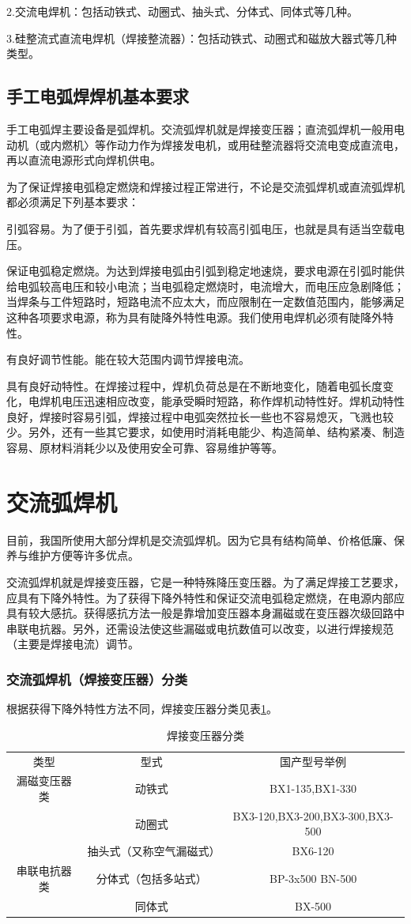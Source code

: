 \documentclass{ctexbook}
\begin{document}
2.交流电焊机：包括动铁式、动圈式、抽头式、分体式、同体式等几种。

3.硅整流式直流电焊机（焊接整流器）：包括动铁式、动圈式和磁放大器式等几种类型。
\subsection{手工电弧焊焊机基本要求}
手工电弧焊主要设备是弧焊机。交流弧焊机就是焊接变压器；直流弧焊机一般用电动机（或内燃机〉等作动力作为焊接发电机，或用硅整流器将交流电变成直流电，再以直流电源形式向焊机供电。

为了保证焊接电弧稳定燃烧和焊接过程正常进行，不论是交流弧焊机或直流弧焊机都必须满足下列基本要求：

引弧容易。为了便于引弧，首先要求焊机有较高引弧电压，也就是具有适当空载电压。

保证电弧稳定燃烧。为达到焊接电弧由引弧到稳定地速烧，要求电源在引弧时能供给电弧较高电压和较小电流；当电弧稳定燃烧时，电流增大，而电压应急剧降低；当焊条与工件短路时，短路电流不应太大，而应限制在一定数值范围内，能够满足这种各项要求电源，称为具有陡降外特性电源。我们使用电焊机必须有陡降外特性。

有良好调节性能。能在较大范围内调节焊接电流。

具有良好动特性。在焊接过程中，焊机负荷总是在不断地变化，随着电弧长度变化，电焊机电压迅速相应改变，能承受瞬时短路，称作焊机动特性好。焊机动特性良好，焊接时容易引弧，焊接过程中电弧突然拉长一些也不容易熄灭，飞溅也较少。另外，还有一些其它要求，如使用时消耗电能少、构造简单、结构紧凑、制造容易、原材料消耗少以及使用安全可靠、容易维护等等。
\section{交流弧焊机}
目前，我国所使用大部分焊机是交流弧焊机。因为它具有结构简单、价格低廉、保养与维护方便等许多优点。

交流弧焊机就是焊接变压器，它是一种特殊降压变压器。为了满足焊接工艺要求，应具有下降外特性。为了获得下降外特性和保证交流电弧稳定燃烧，在电源内部应具有较大感抗。获得感抗方法一般是靠增加变压器本身漏磁或在变压器次级回路中串联电抗器。另外，还需设法使这些漏磁或电抗数值可以改变，以进行焊接规范（主要是焊接电流）调节。
\subsubsection{交流弧焊机（焊接变压器）分类}
根据获得下降外特性方法不同，焊接变压器分类见表\ref{tab:banyaqifenlei}。
\begin{table}[htbp]
	\centering
	\caption{焊接变压器分类}
	\begin{tabular}{ccc}
		类型    & 型式    & 国产型号举例 \\
		漏磁变压器类 & 动铁式   & BX1-135,BX1-330 \\
		& 动圈式   & BX3-120,BX3-200,BX3-300,BX3-500 \\
		& 抽头式（又称空气漏磁式） & BX6-120 \\
		串联电抗器类 & 分体式（包括多站式） & BP-3x500 BN-500 \\
		& 同体式   & BX-500 \\
	\end{tabular}%
	\label{tab:banyaqifenlei}%
\end{table}%
\end{document}

